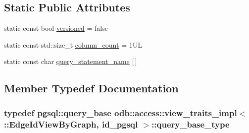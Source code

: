 \subsection*{Static Public Attributes}
\begin{DoxyCompactItemize}
\item 
static const bool \hyperlink{classodb_1_1access_1_1view__traits__impl_3_01_1_1_edge_id_view_by_graph_00_01id__pgsql_01_4_a04fe6440050eb1e2f892a942416cb436}{versioned} = false
\item 
static const std\+::size\+\_\+t \hyperlink{classodb_1_1access_1_1view__traits__impl_3_01_1_1_edge_id_view_by_graph_00_01id__pgsql_01_4_ad28fa5ddc43b39e73f58aa4358e9ca18}{column\+\_\+count} = 1\+U\+L
\item 
static const char \hyperlink{classodb_1_1access_1_1view__traits__impl_3_01_1_1_edge_id_view_by_graph_00_01id__pgsql_01_4_a32436fb44381c6c1ff817549849fa1ca}{query\+\_\+statement\+\_\+name} \mbox{[}$\,$\mbox{]}
\end{DoxyCompactItemize}


\subsection{Member Typedef Documentation}
\hypertarget{classodb_1_1access_1_1view__traits__impl_3_01_1_1_edge_id_view_by_graph_00_01id__pgsql_01_4_a671b622be60c353f020d89bb3e5b68ed}{}
\subsubsection[{query\+\_\+base\+\_\+type}]{\setlength{\rightskip}{0pt plus 5cm}typedef pgsql\+::query\+\_\+base odb\+::access\+::view\+\_\+traits\+\_\+impl$<$ \+::{\bf Edge\+Id\+View\+By\+Graph}, id\+\_\+pgsql $>$\+::{\bf query\+\_\+base\+\_\+type}}\label{classodb_1_1access_1_1view__traits__impl_3_01_1_1_edge_id_view_by_graph_00_01id__pgsql_01_4_a671b622be60c353f020d89bb3e5b68ed}
\hypertarget{classodb_1_1access_1_1view__traits__impl_3_01_1_1_edge_id_view_by_graph_00_01id__pgsql_01_4_a0d91393fadacd4a8aee90569df84a193}{}
